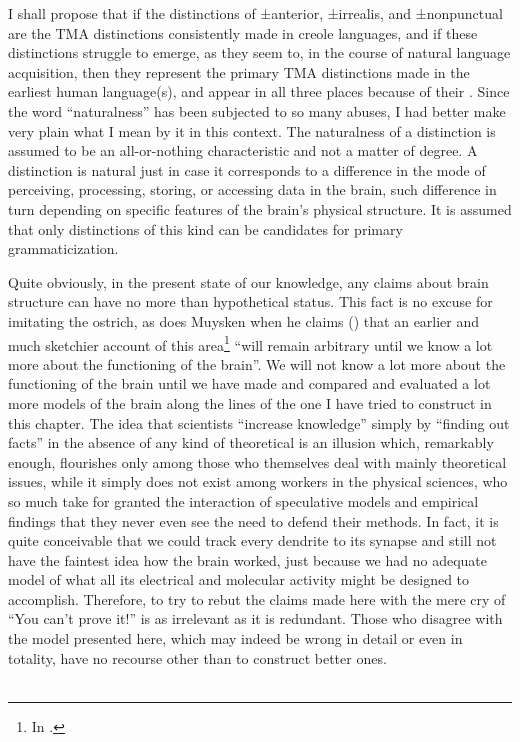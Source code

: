 I shall propose that if the distinctions of ±anterior, ±irrealis, and ±nonpunctual are the TMA distinctions consistently made in creole languages, and if these distinctions struggle to emerge, as they seem to, in the course of natural language acquisition, then they represent the primary TMA distinctions made in the earliest human language(s), and appear in all three places because of their . Since the word ``naturalness'' has been subjected to so many abuses, I had better make very plain what I mean by it in this context. The naturalness of a distinction is assumed to be an all-or-nothing characteristic and not a matter of degree. A distinction is natural just in case it corresponds to a difference in the mode of perceiving, processing, storing, or accessing data in the brain, such difference in turn depending on specific features of the brain's physical structure. It is assumed that only distinctions of this kind can be candidates for primary grammaticization.

Quite obviously, in the present state of our knowledge, any claims about brain structure can have no more than hypothetical status. This fact is no excuse for imitating the ostrich, as does Muysken when he claims (\citeyear{Muysken1981a}) that an earlier and much sketchier account of this area\footnote{In \citealt{Bickerton1974}.} ``will remain arbitrary until we know a lot more about the functioning of the brain''. We will not know a lot more about the functioning of the brain until we have made and compared and evaluated a lot more models of the brain along the lines of the one I have tried to construct in this chapter. The idea that scientists ``increase knowledge'' simply by ``finding out facts'' in the absence of any kind of theoretical  is an illusion which, remarkably enough, flourishes only among those who themselves deal with mainly theoretical issues, while it simply does not exist among workers in the physical sciences, who so much take for granted the interaction of speculative models and empirical findings that they never even see the need to defend their methods. In fact, it is quite conceivable that we could track every dendrite to its synapse and still not have the faintest idea
how the brain worked, just because we had no adequate model of what all its electrical and molecular activity might be designed to accomplish. Therefore, to try to rebut the claims made here with the mere cry of ``You can't prove it!'' is as irrelevant as it is redundant. Those who disagree with the model presented here, which may indeed be wrong in detail or even in totality, have no recourse other than to construct better ones.\\\\


